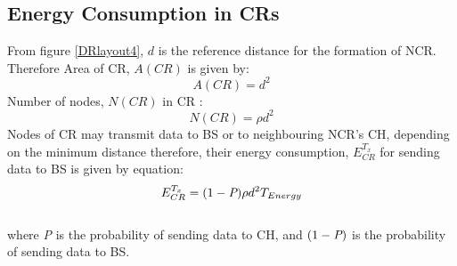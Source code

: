 \documentclass[3p,times,procedia]{elsarticle}
\begin{document}
\subsection{Energy Consumption in CRs}
From figure \ref{DRlayout4}, $d$ is the reference distance for the formation of NCR. Therefore Area of CR, $A(CR)$ is given by:
\begin{equation}
 A(CR) = d^{2}
\end{equation}
 Number of nodes, $N(CR)$ in CR :
\begin{equation}
  N(CR) = \rho d^{2}
\end{equation}
 Nodes of CR may transmit data to BS or to neighbouring NCR's CH, depending on the minimum distance therefore, their energy consumption, $E^{T_{x}}_{CR}$ for sending data to BS is given by equation:
\begin{equation}
  E^{T_{x}}_{CR} = (1-\emph{P})\rho d^{2} T_{Energy}
\end{equation}
\\ where \emph{P} is the probability of sending data to CH, and $(1-\emph{P})$ is the probability of sending data to BS.
\end{document}
